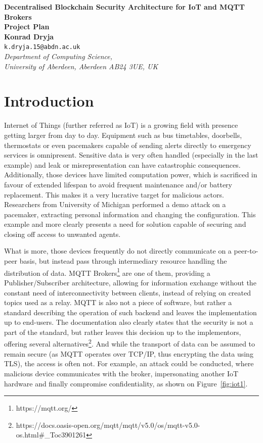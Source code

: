 \documentclass[a4paper,12pt]{article}
\begin{document}
\begin{center}
{\Large\bf{Decentralised Blockchain Security Architecture for IoT and MQTT Brokers}} \\
      \vspace{5.0mm}
{\Large\bf{Project Plan}} \\
      \vspace{8mm}
      {\large\bf{Konrad Dryja}}  \\
      \vspace{5.0mm}
       {\tt k.dryja.15@abdn.ac.uk} \\
      \vspace{5.0mm}
      {\em Department of Computing Science,\\
       University of Aberdeen, Aberdeen AB24 3UE, UK} 
\end{center}


\section*{Introduction}

Internet of Things (further referred as IoT) is a growing field with presence getting larger from day to day. Equipment such as bus timetables, doorbells, thermostats or even pacemakers capable of sending alerts directly to emergency services is omnipresent. Sensitive data is very often handled (especially in the last example) and leak or misrepresentation can have catastrophic consequences. Additionally, those devices have limited computation power, which is sacrificed in favour of extended lifespan to avoid frequent maintenance and/or battery replacement. This makes it a very lucrative target for malicious actors. Researchers from University of Michigan performed a demo attack on a pacemaker, extracting personal information and changing the configuration.\cite{4531149} This example and more clearly presents a need for solution capable of securing and closing off access to unwanted agents.

What is more, those devices frequently do not directly communicate on a peer-to-peer basis, but instead pass through intermediary resource handling the distribution of data. MQTT Brokers\footnote{https://mqtt.org/} are one of them, providing a Publisher/Subscriber architecture, allowing for information exchange without the constant need of interconnectivity between clients, instead of relying on created topics used as a relay. MQTT is also not a piece of software, but rather a standard describing the operation of such backend and leaves the implementation up to end-users. The documentation also clearly states that the security is not a part of the standard, but rather leaves this decision up to the implementors, offering several alternatives\footnote{https://docs.oasis-open.org/mqtt/mqtt/v5.0/os/mqtt-v5.0-os.html\#\_Toc3901261}. And while the transport of data can be assumed to remain secure (as MQTT operates over TCP/IP, thus encrypting the data using TLS), the access is often not. For example, an attack could be conducted, where malicious device communicates with the broker, impersonating another IoT hardware and finally compromise confidentiality, as shown on Figure~\ref{fig:iot1}.
\end{document}
